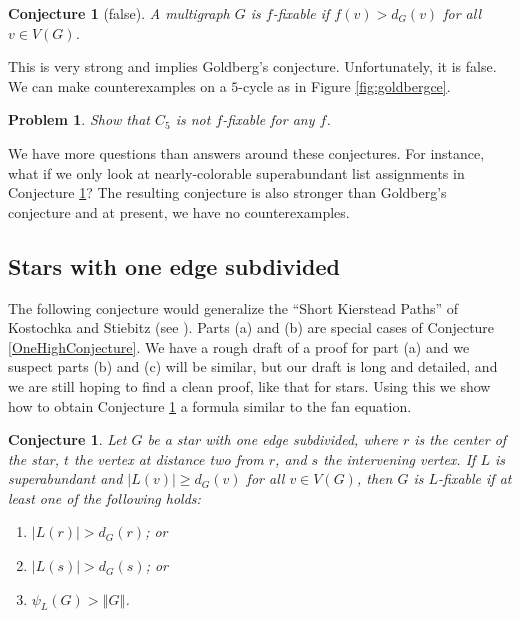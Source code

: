 \documentclass[12pt]{article}
\theoremstyle{plain}
\newtheorem{conjecture}[thm]{Conjecture}
\newtheorem*{problem}{Problem}
\theoremstyle{definition}
\theoremstyle{remark}
\newcommand{\size}[1]{\left\Vert#1\right\Vert}
\begin{document}

\begin{conjecture}[false]
	A multigraph $G$ is $f$-fixable if $f(v) > d_G(v)$ for all $v \in V(G)$.
	\label{MoonshineConjecture}
\end{conjecture}

This is very strong and implies Goldberg's conjecture.  Unfortunately, it is false. 
We can make counterexamples on a $5$-cycle as in Figure \ref{fig:goldbergce}.

\begin{problem}
	Show that $C_5$ is not $f$-fixable for any $f$.
\end{problem}

We have more questions than answers around these conjectures.  For instance, what if we only look at nearly-colorable superabundant list assignments in Conjecture \ref{MoonshineConjecture}?  The resulting conjecture is also stronger than Goldberg's conjecture and at present, we have no counterexamples.
	
\subsection{Stars with one edge subdivided}
The following conjecture would generalize the ``Short Kierstead Paths'' of Kostochka
and Stiebitz (see \cite{stiebitz2012graph}).  Parts (a) and (b) are special cases of
Conjecture \ref{OneHighConjecture}.  We have a rough draft of a proof for part
(a) and we suspect parts (b) and (c) will be similar, 
but our draft is long and detailed, and we are still hoping to find a clean
proof, like that for stars.
Using this we show how to obtain Conjecture \ref{StarWithOneEdgeSubdivided} a
formula similar to the fan equation.

\begin{conjecture}\label{StarWithOneEdgeSubdivided}
Let $G$ be a star with one edge subdivided, where $r$ is the center of the
star, $t$ the vertex at distance two from $r$, and $s$ the intervening vertex.  
If $L$ is superabundant and $|L(v)| \ge d_G(v)$ for all 
$v \in V(G)$, then $G$ is $L$-fixable if at least one of the following holds:
\begin{enumerate}
\item[(a)] $|L(r)| > d_G(r)$; or
\item[(b)] $|L(s)| > d_G(s)$; or
\item[(c)] $\psi_L(G) > \size{G}$.
\end{enumerate}
\end{conjecture}
\end{document}
